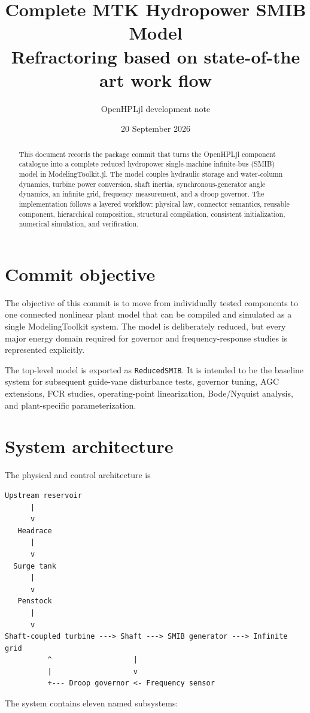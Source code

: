 \documentclass[11pt,a4paper]{article}
\title{Complete MTK Hydropower SMIB Model\\\large Refractoring based on state-of-the art work flow}
\author{OpenHPLjl development note}
\date{20 September 2026}
\begin{document}
\maketitle

\begin{abstract}
This document records the package commit that turns the OpenHPLjl component catalogue into a complete reduced hydropower single-machine infinite-bus (SMIB) model in ModelingToolkit.jl. The model couples hydraulic storage and water-column dynamics, turbine power conversion, shaft inertia, synchronous-generator angle dynamics, an infinite grid, frequency measurement, and a droop governor. The implementation follows a layered workflow: physical law, connector semantics, reusable component, hierarchical composition, structural compilation, consistent initialization, numerical simulation, and verification.
\end{abstract}

\section{Commit objective}
The objective of this commit is to move from individually tested components to one connected nonlinear plant model that can be compiled and simulated as a single ModelingToolkit system. The model is deliberately reduced, but every major energy domain required for governor and frequency-response studies is represented explicitly.

The top-level model is exported as \texttt{ReducedSMIB}. It is intended to be the baseline system for subsequent guide-vane disturbance tests, governor tuning, AGC extensions, FCR studies, operating-point linearization, Bode/Nyquist analysis, and plant-specific parameterization.

\section{System architecture}
The physical and control architecture is

\begin{verbatim}
Upstream reservoir
      |
      v
   Headrace
      |
      v
  Surge tank
      |
      v
   Penstock
      |
      v
Shaft-coupled turbine ---> Shaft ---> SMIB generator ---> Infinite grid
          ^                   |
          |                   v
          +--- Droop governor <- Frequency sensor
\end{verbatim}

The system contains eleven named subsystems:
\end{document}
